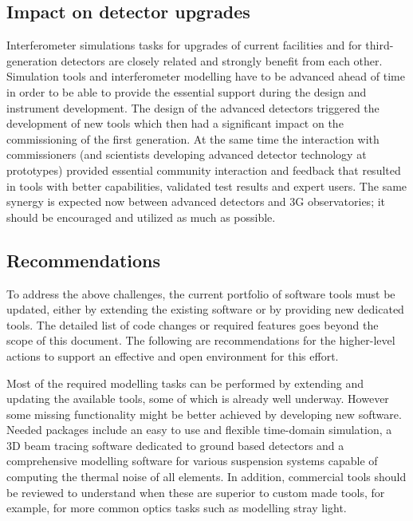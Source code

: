 \subsection{Impact on detector upgrades}
Interferometer simulations tasks for upgrades of current facilities and for third-generation detectors are closely related and strongly benefit from each other. Simulation tools and interferometer modelling have to be advanced ahead of time in order to be able to provide the essential
support during the design and instrument development. The design of the advanced detectors triggered the development of new tools which then had a significant impact on the commissioning of the first generation. At the same time the interaction with commissioners (and scientists developing advanced detector
technology at prototypes) provided essential community interaction and feedback that resulted in tools with better capabilities, validated test results and expert users. The same synergy is expected now between advanced detectors and 3G observatories; it should be encouraged and utilized as much as possible.

\subsection{Recommendations}
To address the above challenges, the current portfolio of software tools must be updated, either by extending the existing software or by providing new dedicated tools. The detailed list of code changes or required features goes beyond the scope of this document. The following are recommendations for the higher-level actions to support an effective and open environment for this effort.

Most of the required modelling tasks can be performed by extending and updating the available tools, some of which is already well underway. However some missing functionality might be better achieved by developing new software. Needed packages include an easy to use and flexible time-domain simulation, a 3D beam tracing software dedicated to ground based detectors and a comprehensive modelling software for various suspension systems capable of computing the thermal noise of all elements. In addition, commercial tools should be reviewed to understand when these are superior to custom made tools, for example, for more common optics tasks such as modelling stray light.

